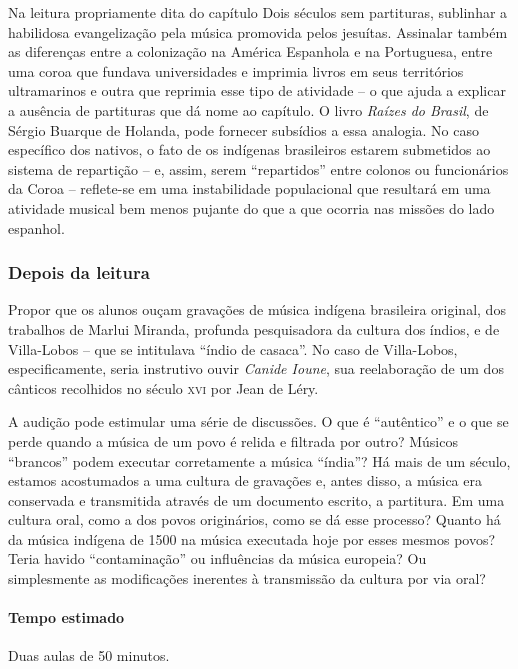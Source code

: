 \documentclass[11pt]{extarticle}
\begin{document}
Na leitura propriamente dita do capítulo Dois séculos sem
partituras, sublinhar a habilidosa evangelização pela música promovida pelos
jesuítas. Assinalar também as diferenças entre a colonização na América
Espanhola e na Portuguesa, entre uma coroa que fundava universidades e imprimia
livros em seus territórios ultramarinos e outra que reprimia esse tipo de
atividade – o que ajuda a explicar a ausência de partituras que dá nome ao
capítulo. O livro \emph{Raízes do Brasil}, de Sérgio Buarque de Holanda, pode fornecer
subsídios a essa analogia. No caso específico dos nativos, o fato de os
indígenas brasileiros estarem submetidos ao sistema de repartição – e, assim,
serem “repartidos” entre colonos ou funcionários da Coroa – reflete-se em uma
instabilidade populacional que resultará em uma atividade musical bem menos
pujante do que a que ocorria nas missões do lado espanhol. 

\subsubsection{Depois da leitura}


Propor que os alunos ouçam gravações de música indígena brasileira original,
dos trabalhos de Marlui Miranda, profunda pesquisadora da cultura dos índios, e
de Villa-Lobos – que se intitulava “índio de casaca”. No caso de Villa-Lobos,
especificamente, seria instrutivo ouvir \emph{Canide Ioune}, sua reelaboração de um
dos cânticos recolhidos no século \textsc{xvi} por Jean de Léry.


A audição pode estimular uma série de discussões. O que é “autêntico”
e o que se perde quando a música de um povo é relida e filtrada por outro?
Músicos “brancos” podem executar corretamente a música “índia”? Há mais de um
século, estamos acostumados a uma cultura de gravações e, antes disso, a música
era conservada e transmitida através de um documento escrito, a partitura. Em
uma cultura oral, como a dos povos originários, como se dá esse processo?
Quanto há da música indígena de 1500 na música executada hoje por esses mesmos
povos? Teria havido “contaminação” ou influências da música europeia? Ou
simplesmente as modificações inerentes à transmissão da cultura por via oral?

\paragraph{Tempo estimado} Duas aulas de 50 minutos.
\end{document}
